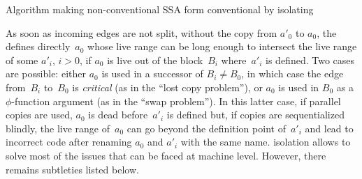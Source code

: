\begin{algorithm}
 \caption{\label{alg:alternative_ssa_destruction:sreedhar}Algorithm making non-conventional SSA form conventional by isolating \phinodes}
\end{algorithm}

As soon as incoming edges are not split, without the copy from $a'_0$ to $a_0$, the \phifun defines
directly~$a_0$ whose live range can be long enough to intersect the live range
of some $a'_i$, $i>0$, if $a_0$ is live out of the block~$B_i$ where~$a'_i$ is
defined. Two cases are possible: either $a_0$ is used in a successor of $B_i
\neq B_0$, in which case the edge from~$B_i$ to~$B_0$ is \emph{critical} (as in
the ``lost copy problem''), or $a_0$ is used in $B_0$ as a $\phi$-function
argument (as in the ``swap problem''). In this latter case, if parallel copies
are used, $a_0$ is dead before~$a'_i$ is defined but, if copies are
sequentialized blindly, the live range of~$a_0$ can go beyond the definition
point of~$a'_i$ and lead to incorrect code after renaming $a_0$ and $a'_i$ with
the same name. \phinode isolation allows to solve most of the issues that can be faced at machine level. However, there remains subtleties listed below.

